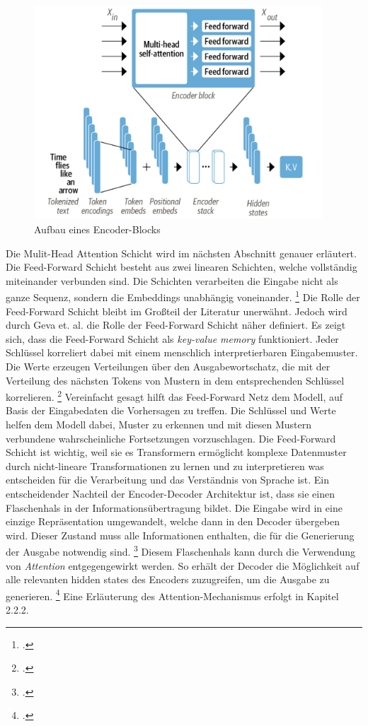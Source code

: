\begin{figure}[h]
    \centering
    \includegraphics[height=80mm]{graphics/encoder-block.png}
    \caption[Aufbau eines Encoder-Blocks]{Aufbau eines Encoder-Blocks \footnotemark}
    \label{fig:encoder-block}
\end{figure}
Die Mulit-Head Attention Schicht wird im nächsten Abschnitt genauer erläutert. Die Feed-Forward Schicht besteht aus zwei linearen Schichten, welche vollständig miteinander verbunden sind. Die Schichten verarbeiten die Eingabe nicht als ganze Sequenz, sondern die Embeddings unabhängig voneinander. \footcites[Vgl.][S. 70]{tunstall_natural_2022} Die Rolle der Feed-Forward Schicht bleibt im Großteil der Literatur unerwähnt. Jedoch wird durch Geva et. al. die Rolle der Feed-Forward Schicht näher definiert. Es zeigt sich, dass die Feed-Forward Schicht als \emph{key-value memory} funktioniert. Jeder Schlüssel korreliert dabei mit einem menschlich interpretierbaren Eingabemuster. Die Werte erzeugen Verteilungen über den Ausgabewortschatz, die mit der Verteilung des nächsten Tokens von Mustern in dem entsprechenden Schlüssel korrelieren. \footcites[Vgl. dazu ausführlich][S. 5484 ff.]  {geva_transformer_2020} Vereinfacht gesagt hilft das Feed-Forward Netz dem Modell, auf Basis der Eingabedaten die Vorhersagen zu treffen. Die Schlüssel und Werte helfen dem Modell dabei, Muster zu erkennen und mit diesen Mustern verbundene wahrscheinliche Fortsetzungen vorzuschlagen. Die Feed-Forward Schicht ist wichtig, weil sie es Transformern ermöglicht komplexe Datenmuster durch nicht-lineare Transformationen zu lernen und zu interpretieren was entscheiden für die Verarbeitung und das Verständnis von Sprache ist.
Ein entscheidender Nachteil der Encoder-Decoder Architektur ist, dass sie einen Flaschenhals in der Informationsübertragung bildet. Die Eingabe wird in eine einzige Repräsentation umgewandelt, welche dann in den Decoder übergeben wird. Dieser Zustand muss alle Informationen enthalten, die für die Generierung der Ausgabe notwendig sind. \footcites[Vgl.][S. 6 ff.]{tunstall_natural_2022} Diesem Flaschenhals kann durch die Verwendung von \emph{Attention} entgegengewirkt werden. So erhält der Decoder die Möglichkeit auf alle relevanten hidden states des Encoders zuzugreifen, um die Ausgabe zu generieren. \footcites[Vgl.][S. 9]{bahdanau_neural_2014} Eine Erläuterung des Attention-Mechanismus erfolgt in Kapitel 2.2.2.

